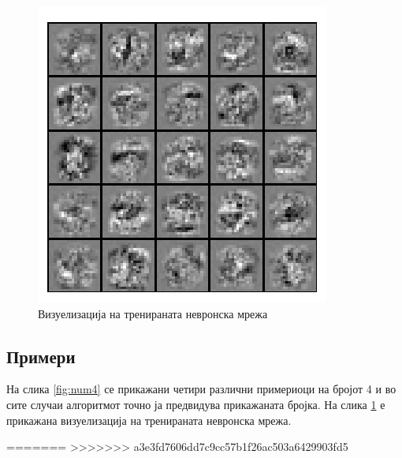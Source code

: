 \begin{figure}[htb]
\centering
\includegraphics[width=.6\textwidth]{src/neuralNetwork2/nn_viz}
\caption{Визуелизација на тренираната невронска мрежа}
\label{fig:viz}
\end{figure}

\subsection{Примери}

На слика \ref{fig:num4} се прикажани четири различни примериоци на бројот 4 и во
сите случаи алгоритмот точно ја предвидува прикажаната бројка. На слика
\ref{fig:viz} е прикажана визуелизација на тренираната невронска мрежа.





=======
>>>>>>> a3e3fd7606dd7c9cc57b1f26ac503a6429903fd5
